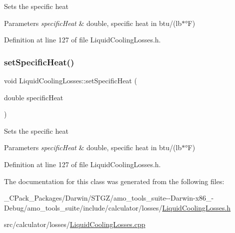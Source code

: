 Sets the specific heat 
\begin{DoxyParams}{Parameters}
{\em specific\+Heat} & double, specific heat in btu/(lb$\ast$°F) \\
\hline
\end{DoxyParams}


Definition at line 127 of file Liquid\+Cooling\+Losses.\+h.

\mbox{\label{class_liquid_cooling_losses_a38ff1ff4dc0de69c72db094bf2259993}} 
\subsubsection{\texorpdfstring{set\+Specific\+Heat()}{setSpecificHeat()}\hspace{0.1cm}{\footnotesize\ttfamily [3/3]}}
{\footnotesize\ttfamily void Liquid\+Cooling\+Losses\+::set\+Specific\+Heat (\begin{DoxyParamCaption}\item[{double}]{specific\+Heat }\end{DoxyParamCaption})\hspace{0.3cm}{\ttfamily [inline]}}

Sets the specific heat 
\begin{DoxyParams}{Parameters}
{\em specific\+Heat} & double, specific heat in btu/(lb$\ast$°F) \\
\hline
\end{DoxyParams}


Definition at line 127 of file Liquid\+Cooling\+Losses.\+h.



The documentation for this class was generated from the following files\+:\begin{DoxyCompactItemize}
\item 
\+\_\+\+C\+Pack\+\_\+\+Packages/\+Darwin/\+S\+T\+G\+Z/amo\+\_\+tools\+\_\+suite-\/-\/\+Darwin-\/x86\+\_-\/\+Debug/amo\+\_\+tools\+\_\+suite/include/calculator/losses/\hyperlink{___c_pack___packages_2_darwin_2_s_t_g_z_2amo__tools__suite--_darwin-x86__64-_debug_2amo__tools__2e6a7324c8a2a69ed2d6c64fe915b79f}{Liquid\+Cooling\+Losses.\+h}\item 
src/calculator/losses/\hyperlink{_liquid_cooling_losses_8cpp}{Liquid\+Cooling\+Losses.\+cpp}\end{DoxyCompactItemize}
